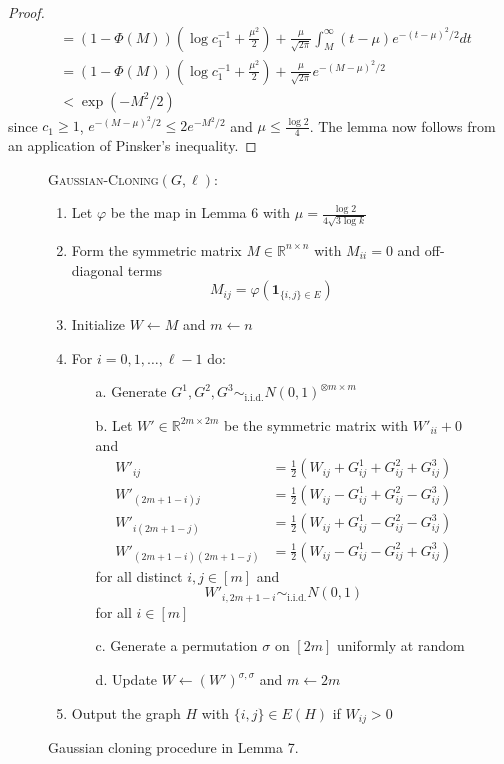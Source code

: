 \documentclass[11pt]{article}
\begin{document}
\begin{proof}
\begin{align*}
&= \left( 1 - \Phi(M)  \right) \left( \log c_1^{-1} + \frac{\mu^2}{2} \right) + \frac{\mu}{\sqrt{2\pi}} \int_{M}^\infty (t - \mu)e^{-(t - \mu)^2/2} dt \\
&= \left( 1 - \Phi(M) \right) \left( \log c_1^{-1} + \frac{\mu^2}{2} \right) + \frac{\mu}{\sqrt{2\pi}} e^{-(M - \mu)^2/2} \\
&< \exp(-M^2/2)
\end{align*}
since $c_1 \ge 1$, $e^{-(M - \mu)^2/2} \le 2e^{-M^2/2}$ and $\mu \le \frac{\log 2}{4}$. The lemma now follows from an application of Pinsker's inequality.
\end{proof}

\begin{figure}[t!]
\begin{algbox}
\textsc{Gaussian-Cloning}$(G, \ell)$:
\begin{enumerate}
\item Let $\varphi$ be the map in Lemma 6 with $\mu = \frac{\log 2}{4 \sqrt{3 \log k}}$
\item Form the symmetric matrix $M \in \mathbb{R}^{n \times n}$ with $M_{ii} = 0$ and off-diagonal terms
$$M_{ij} = \varphi\left(\mathbf{1}_{\{i, j \} \in E}\right)$$
\item Initialize $W \gets M$ and $m \gets n$
\item For $i = 0, 1, \dots, \ell - 1$ do:
\begin{enumerate}
\item[a.] Generate $G^1, G^2, G^3 \sim_{\text{i.i.d.}} N(0, 1)^{\otimes m \times m}$
\item[b.] Let $W' \in \mathbb{R}^{2m \times 2m}$ be the symmetric matrix with $W'_{ii} + 0$ and
\begin{align*}
W'_{ij} &= \frac{1}{2} \left( W_{ij} + G^1_{ij} + G^2_{ij} + G^3_{ij} \right) \\
W'_{(2m+1-i)j} &= \frac{1}{2} \left( W_{ij} - G^1_{ij} + G^2_{ij} - G^3_{ij} \right) \\
W'_{i(2m+1-j)} &= \frac{1}{2} \left( W_{ij} + G^1_{ij} - G^2_{ij} - G^3_{ij} \right) \\
W'_{(2m+1-i)(2m+1-j)} &= \frac{1}{2} \left( W_{ij} - G^1_{ij} - G^2_{ij} + G^3_{ij} \right)
\end{align*}
for all distinct $i, j \in [m]$ and
$$W'_{i, 2m+1 - i} \sim_{\text{i.i.d.}} N(0, 1)$$
for all $i \in [m]$
\item[c.] Generate a permutation $\sigma$ on $[2m]$ uniformly at random
\item[d.] Update $W \gets (W')^{\sigma, \sigma}$ and $m \gets 2m$
\end{enumerate}
\item Output the graph $H$ with $\{i, j \} \in E(H)$ if $W_{ij} > 0$
\end{enumerate}
\vspace{1mm}
\end{algbox}
\caption{Gaussian cloning procedure in Lemma 7.}
\end{figure}
\end{document}
